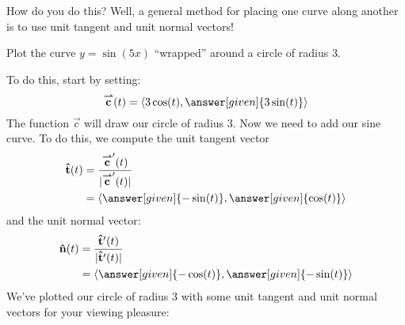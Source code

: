 \documentclass{ximera}
\begin{document}
How do you do this? Well, a general method for placing one curve along
another is to use unit tangent and unit normal vectors!
\begin{example}
  Plot the curve $y= \sin(5x)$ ``wrapped'' around a circle of radius $3$.
  \begin{explanation}
    To do this, start by setting:
    \[
    \vec{c}(t) = \vector{3\cos(t),\answer[given]{3\sin(t)}}
    \]
    The function $\vec{c}$ will draw our circle of radius $3$.  Now
    we need to add our sine curve. To do this, we compute the unit
    tangent vector
    \begin{align*}
      \utan(t) &= \frac{\vec{c}'(t)}{|\vec{c}'(t)|}\\
      &=\vector{\answer[given]{-\sin(t)},\answer[given]{\cos(t)}}
    \end{align*}
    and the unit normal vector:
    \begin{align*}
      \unormal(t) &= \frac{\utan'(t)}{|\utan'(t)|}\\
      &=\vector{\answer[given]{-\cos(t)},\answer[given]{-\sin(t)}}
    \end{align*}
    We've plotted our circle of radius $3$ with some unit tangent and unit
    normal vectors for your viewing pleasure:
    \begin{image}
\end{image}
\end{explanation}
\end{example}
\end{document}
